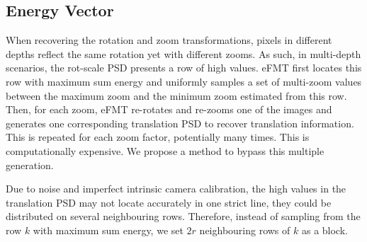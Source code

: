\documentclass[letterpaper, 10 pt, conference]{ieeeconf}  %
\begin{document}
\subsection{Energy Vector}\label{sec:EV}


When recovering the rotation and zoom transformations, pixels in different depths reflect the same rotation yet with different zooms. As such, in multi-depth scenarios, the rot-scale PSD presents a row of high values. eFMT first locates this row with maximum sum energy and uniformly samples a set of multi-zoom values between the maximum zoom and the minimum zoom estimated from this row. Then, for each zoom, eFMT re-rotates and re-zooms one of the images and generates one corresponding translation PSD to recover translation information. This is repeated for each zoom factor, potentially many times. This is computationally expensive. We propose a method to bypass this multiple generation.

Due to noise and imperfect intrinsic camera calibration, the high values in the translation PSD may not locate accurately in one strict line, they could be distributed on several neighbouring rows.  Therefore, instead of sampling from the row $k$ with maximum sum energy, we set $2r$ neighbouring rows of $k$ as a block.
\end{document}
